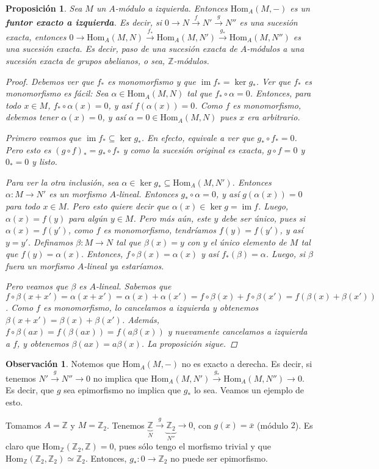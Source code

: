 \documentclass[12pt]{book}
\newtheorem{prop}[teo]{Proposición}
\theoremstyle{definition}
\newtheorem{obs}[teo]{Observación}
\newcommand{\ZZ}{\mathbb{Z}}      %
\renewcommand{\hom}{\mathrm{Hom}}
\DeclareMathOperator{\im}{im}
\begin{document}
\begin{prop}
Sea $M$ un $A$-módulo a izquierda. Entonces $\hom_A(M,-)$ es un \textbf{funtor exacto a izquierda}. Es decir, si $0\longrightarrow N\stackrel{f}{\longrightarrow}N'\stackrel{g}{\longrightarrow}N''$ es una sucesión exacta, entonces $0\longrightarrow \hom_A(M,N)\stackrel{f_*}{\longrightarrow}\hom_A(M,N')\stackrel{g_*}{\longrightarrow}\hom_A(M,N'')$ es una sucesión exacta. Es decir, paso de una sucesión exacta de $A$-módulos a una sucesión exacta de grupos abelianos, o sea, $\ZZ$-módulos.
\begin{proof}
Debemos ver que $f_*$ es monomorfismo y que $\im f_* = \ker g_*$. Ver que $f_*$ es monomorfismo es fácil: Sea $\alpha\in\hom_A(M,N)$ tal que $f_*\circ \alpha = 0$. Entonces, para todo $x\in M$, $f_*\circ \alpha (x) = 0$, y así $f(\alpha(x))=0$. Como $f$ es monomorfismo, debemos tener $\alpha(x)=0$, y así $\alpha=0\in\hom_A(M,N)$ pues $x$ era arbitrario.

Primero veamos que $\im f_*\subseteq \ker g_*$. En efecto, equivale a ver que $g_*\circ f_* = 0$. Pero esto es $(g\circ f)_* = g_*\circ f_*$ y como la sucesión original es exacta, $g\circ f=0$ y $0_*=0$ y listo.

Para ver la otra inclusión, sea $\alpha\in\ker g_*\subseteq \hom_A(M,N')$. Entonces $\alpha:M\to N'$ es un morfismo $A$-lineal. Entonces $g_*\circ \alpha=0$, y así $g(\alpha(x))=0$ para todo $x\in M$. Pero esto quiere decir que $\alpha(x)\in \ker g = \im f$. Luego, $\alpha(x)=f(y)$ para algún $y\in M$. Pero más aún, este $y$ debe ser único, pues si $\alpha(x)=f(y')$, como $f$ es monomorfismo, tendríamos $f(y)=f(y')$, y así $y=y'$. Definamos $\beta:M\to N$ tal que $\beta(x) = y$ con $y$ el único elemento de $M$ tal que $f(y)=\alpha(x)$. Entonces, $f\circ \beta(x)=\alpha(x)$ y así $f_*(\beta)=\alpha$. Luego, si $\beta$ fuera un morfismo $A$-lineal ya estaríamos.

Pero veamos que $\beta$ es $A$-lineal. Sabemos que $f\circ \beta(x+x') = \alpha(x+x') = \alpha(x) + \alpha(x') = f\circ\beta(x)+f\circ\beta(x') = f(\beta(x)+\beta(x'))$. Como $f$ es monomorfismo, lo cancelamos a izquierda y obtenemos $\beta(x+x') = \beta(x)+\beta(x')$. Además, $f\circ \beta(ax) = f(\beta(ax)) = f(a\beta(x))$ y nuevamente cancelamos a izquierda a $f$, y obtenemos $\beta(ax) = a\beta(x)$. La proposición sigue.
\end{proof}
\end{prop}

\begin{obs}
Notemos que $\hom_A(M,-)$ no es exacto a derecha. Es decir, si tenemos $N'\stackrel{g}{\longrightarrow} N''\longrightarrow 0$ no implica que $\hom_A(M,N')\stackrel{g_*}{\longrightarrow} \hom_A(M,N'')\longrightarrow 0$. Es decir, que $g$ sea epimorfismo no implica que $g_*$ lo sea. Veamos un ejemplo de esto.

Tomamos $A=\ZZ$ y $M=\ZZ_2$. Tenemos $\underbrace{\ZZ}_{N}\stackrel{g}{\longrightarrow} \underbrace{\ZZ_2}_{N''}\longrightarrow 0$, con $g(x)=\overline{x}$ (módulo $2$). Es claro que $\hom_\ZZ (\ZZ_2,\ZZ)=0$, pues sólo tengo el morfismo trivial y que $\hom_{\ZZ}(\ZZ_2,\ZZ_2)\simeq \ZZ_2$. Entonces, $g_*:0\to\ZZ_2$ no puede ser epimorfismo.
\end{obs}
\end{document}
